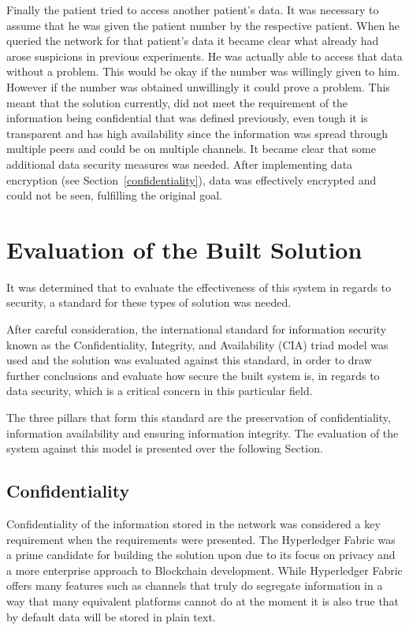 Finally the patient tried to access another patient's data. It was necessary to
assume that he was given the patient number by the respective patient. When he
queried the network for that patient's data it became clear what already had
arose suspicions in previous experiments. He was actually able to access that
data without a problem. This would be okay if the number was willingly given to
him. However if the number was obtained unwillingly it could prove a problem.
This meant that the solution currently, did not meet the requirement of the
information being confidential that was defined previously, even tough it is
transparent and has high availability since the information was spread through
multiple peers and could be on multiple channels. It became clear that some
additional data security measures was needed. After implementing data
encryption (see Section~\ref{confidentiality}), data was effectively encrypted
and could not be seen, fulfilling the original goal.

\section{Evaluation of the Built Solution}

It was determined that to evaluate the effectiveness of this system in regards
to security, a standard for these types of solution was needed. 

After careful consideration, the international standard for information
security known as the Confidentiality, Integrity, and Availability (CIA) triad
model was used and the solution was evaluated against this standard, in order
to draw further conclusions and evaluate how secure the built system is, in
regards to data security, which is a critical concern in this particular field. 

The three pillars that form this standard are the preservation of
confidentiality, information availability and ensuring information integrity.
The evaluation of the system against this model is presented over the following
Section.

\subsection{Confidentiality}

Confidentiality of the information stored in the network was considered a key
requirement when the requirements were presented. The Hyperledger Fabric was a
prime candidate for building the solution upon due to its focus on privacy and
a more enterprise approach to Blockchain development. While Hyperledger Fabric
offers many features such as channels that truly do segregate information in a
way that many equivalent platforms cannot do at the moment it is also true that
by default data will be stored in plain text. 

